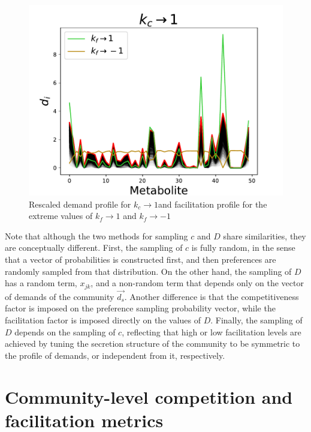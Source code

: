 \documentclass[12pt]{article}
\begin{document}
	\begin{figure}
		\centering
		\includegraphics[width=\textwidth]{competition_facilitation_kf1_1_kc1.pdf}\hfill
		\caption{Rescaled demand profile for $ k_c \rightarrow 1 $and facilitation profile for the extreme values of $ k_f \rightarrow 1 $ and $ k_f \rightarrow -1 $}
		\label{sampling_D}
	\end{figure}
	Note that although the two methods for sampling $ c $ and $ D $ share similarities, they are conceptually different. First, the sampling of $ c $ is fully random, in the sense that a vector of probabilities is constructed first, and then preferences are randomly sampled from that distribution. On the other hand, the sampling of $ D $ has a random term, $ x_{jk} $, and a non-random term that depends only on the vector of demands of the community $ \vec{d_s} $. Another difference is that the competitiveness factor is imposed on the preference sampling probability vector, while the facilitation factor is imposed directly on the values of $ D $. Finally, the sampling of $ D $ depends on the sampling of $ c $, reflecting that high or low facilitation levels are achieved by tuning the secretion structure of the community to be symmetric to the profile of demands, or independent from it, respectively.
	
	\section{Community-level competition and facilitation metrics}
	
\end{document}
